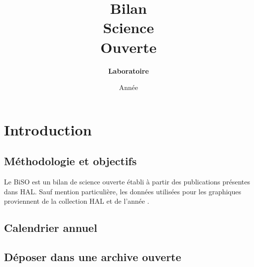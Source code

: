 \documentclass[french,11pt]{dibiso/biso}
\title{Bilan \\ Science \\ Ouverte}
\subtitle{\textbf{Laboratoire \tuttiCfgEntityAcronym} \\
  \medskip
  \tuttiCfgEntityFullName}
\date{Année \tuttiCfgYear}
\date{}
\begin{document}
\maketitle
\tableofcontents
\clearpage
\section{Introduction}
\subsection*{Méthodologie et objectifs}
Le BiSO est un bilan de science ouverte établi à partir des publications
présentes dans HAL. Sauf mention particulière, les données utilisées pour les
graphiques proviennent de la collection HAL \texttt{\tuttiCfgEntityId} et de
l’année \tuttiCfgYear.







\subsection*{Calendrier annuel}






\subsection*{Déposer dans une archive ouverte}






\clearpage


\end{document}
